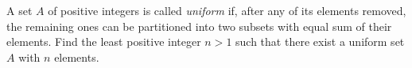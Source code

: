 A set $A$ of positive integers is called \textit{uniform} if, after any of its elements removed, the remaining ones can be partitioned into two subsets with equal sum of their elements. Find the least positive integer $n>1$ such that there exist a uniform set $A$ with $n$ elements.